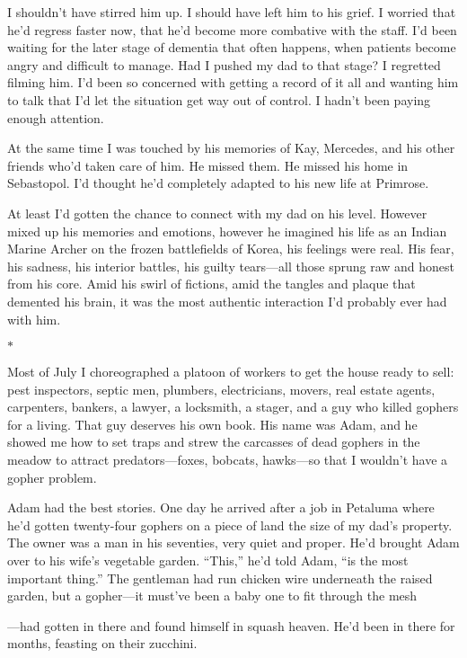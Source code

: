 \documentclass[12pt]{book}
\begin{document}
I shouldn't have stirred him up. I should have left him to his grief. I worried that he'd regress faster now, that he'd become more combative with the staff. I'd been waiting for the later stage of dementia that often happens, when patients become angry and difficult to manage. Had I pushed my dad to that stage? I regretted filming him. I'd been so concerned with getting a record of it all and wanting him to talk that I'd let the situation get way out of control. I hadn't been paying enough attention.

At the same time I was touched by his memories of Kay, Mercedes, and his other friends who'd taken care of him. He missed them. He missed his home in Sebastopol. I'd thought he'd completely adapted to his new life at Primrose.

At least I'd gotten the chance to connect with my dad on his level. However mixed up his memories and emotions, however he imagined his life as an Indian Marine Archer on the frozen battlefields of Korea, his feelings were real. His fear, his sadness, his interior battles, his guilty tears---all those sprung raw and honest from his core. Amid his swirl of fictions, amid the tangles and plaque that demented his brain, it was the most authentic interaction I'd probably ever had with him.

\begin{center}$*$\end{center}

Most of July I choreographed a platoon of workers to get the house ready to sell: pest inspectors, septic men, plumbers, electricians, movers, real estate agents, carpenters, bankers, a lawyer, a locksmith, a stager, and a guy who killed gophers for a living. That guy deserves his own book. His name was Adam, and he showed me how to set traps and strew the carcasses of dead gophers in the meadow to attract predators---foxes, bobcats, hawks---so that I wouldn't have a gopher problem.

Adam had the best stories. One day he arrived after a job in Petaluma where he'd gotten twenty-four gophers on a piece of land the size of my dad's property. The owner was a man in his seventies, very quiet and proper. He'd brought Adam over to his wife's vegetable garden. ``This,'' he'd told Adam, ``is the most important thing.'' The gentleman had run chicken wire underneath the raised garden, but a gopher---it must've been a baby one to fit through the mesh

---had gotten in there and found himself in squash heaven. He'd been in there for months, feasting on their zucchini.
\end{document}
